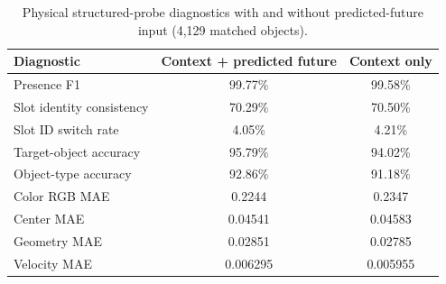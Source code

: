\begin{table}[t]
\centering
\caption{Physical structured-probe diagnostics with and without predicted-future input
(4,129 matched objects).}
\label{tab:physion-full-current}
\small
\setlength{\tabcolsep}{7pt}
\begin{tabular}{@{}lcc@{}}
\toprule
\textbf{Diagnostic} & \textbf{Context + predicted future} & \textbf{Context only} \\
\midrule
Presence F1 & 99.77\% & 99.58\% \\
Slot identity consistency & 70.29\% & 70.50\% \\
Slot ID switch rate & 4.05\% & 4.21\% \\
Target-object accuracy & 95.79\% & 94.02\% \\
Object-type accuracy & 92.86\% & 91.18\% \\
Color RGB MAE & 0.2244 & 0.2347 \\
Center MAE & 0.04541 & 0.04583 \\
Geometry MAE & 0.02851 & 0.02785 \\
Velocity MAE & 0.006295 & 0.005955 \\
\bottomrule
\end{tabular}
\end{table}
